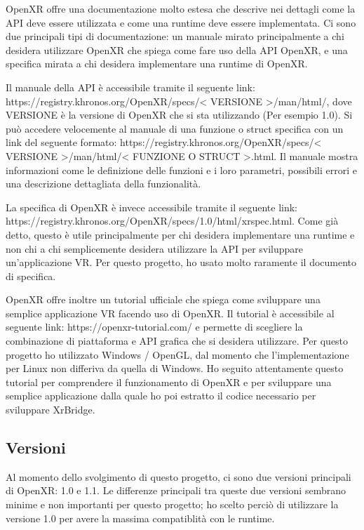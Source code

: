 \documentclass[twoside]{supsistudent}
\begin{document}
OpenXR offre una documentazione molto estesa che descrive nei dettagli come la API deve essere utilizzata e come una runtime deve essere implementata. Ci sono due principali tipi di documentazione: un manuale mirato principalmente a chi desidera utilizzare OpenXR che spiega come fare uso della API OpenXR, e una specifica mirata a chi desidera implementare una runtime di OpenXR.

Il manuale della API è accessibile tramite il seguente link: https://registry.khronos.org/OpenXR/specs/< VERSIONE >/man/html/, dove VERSIONE è la versione di OpenXR che si sta utilizzando (Per esempio 1.0). Si può accedere velocemente al manuale di una funzione o struct specifica con un link del seguente formato: https://registry.khronos.org/OpenXR/specs/< VERSIONE >/man/html/< FUNZIONE O STRUCT >.html. Il manuale mostra informazioni come le definizione delle funzioni e i loro parametri, possibili errori e una descrizione dettagliata della funzionalità.

La specifica di OpenXR è invece accessibile tramite il seguente link: https://registry.khronos.org/OpenXR/specs/1.0/html/xrspec.html. Come già detto, questo è utile principalmente per chi desidera implementare una runtime e non chi a chi semplicemente desidera utilizzare la API per sviluppare un'applicazione VR. Per questo progetto, ho usato molto raramente il documento di specifica.

OpenXR offre inoltre un tutorial ufficiale che spiega come sviluppare una semplice applicazione VR facendo uso di OpenXR. Il tutorial è accessibile al seguente link: https://openxr-tutorial.com/ e permette di scegliere la combinazione di piattaforma e API grafica che si desidera utilizzare. Per questo progetto ho utilizzato Windows / OpenGL, dal momento che l'implementazione per Linux non differiva da quella di Windows. Ho seguito attentamente questo tutorial per comprendere il funzionamento di OpenXR e per sviluppare una semplice applicazione dalla quale ho poi estratto il codice necessario per sviluppare XrBridge.

\subsection{Versioni}

Al momento dello svolgimento di questo progetto, ci sono due versioni principali di OpenXR: 1.0 e 1.1. Le differenze principali tra queste due versioni sembrano minime e non importanti per questo progetto; ho scelto perciò di utilizzare la versione 1.0 per avere la massima compatiblità con le runtime.
\end{document}
